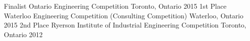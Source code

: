 \begin{cvhonors}
  \cvhonor
    {Finalist}
    {Ontario Engineering Competition}
    {Toronto, Ontario}
    {2015}
  \cvhonor
    {1st Place}
    {Waterloo Engineering Competition (Consulting Competition)}
    {Waterloo, Ontario}
    {2015}
  \cvhonor
    {2nd Place}
    {Ryerson Institute of Industrial Engineering Competition}
    {Toronto, Ontario}
    {2012}
\end{cvhonors}